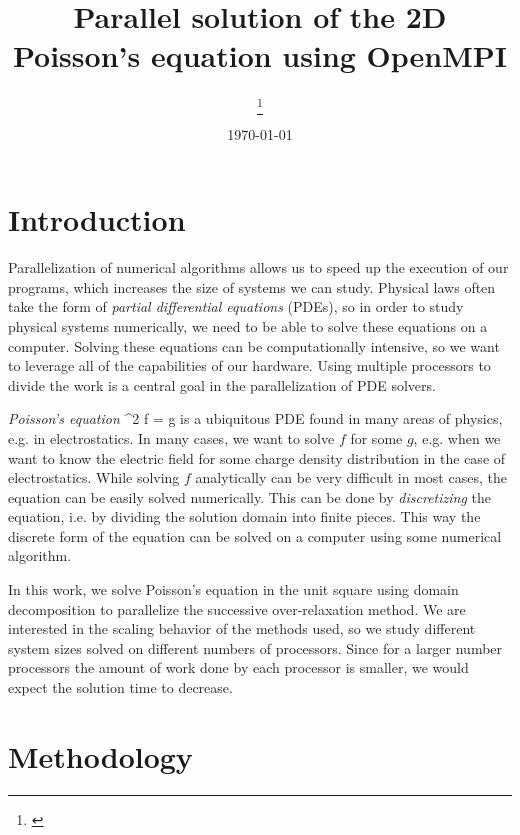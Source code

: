 \documentclass[10pt]{article}
\title {
  Parallel solution of the 2D Poisson's equation using OpenMPI
}
\date{\today}
\author[1] {
  \firstauth
  \orcid{0000-0001-9814-7358}
  \thanks{\href{mailto: \email}{\email}}
}
\begin{document}
\setlength{\belowcaptionskip}{0pt}


\normalsize

\maketitle


\section{Introduction}

Parallelization of numerical algorithms allows us to speed up the execution of our programs, which increases the size of systems we can study. Physical laws often take the form of \textit{partial differential equations} (PDEs), so in order to study physical systems numerically, we need to be able to solve these equations on a computer. Solving these equations can be computationally intensive, so we want to leverage all of the capabilities of our hardware. Using multiple processors to divide the work is a central goal in the parallelization of PDE solvers.

\textit{Poisson's equation}
\be
\nabla^2 f = g
\ee
is a ubiquitous PDE found in many areas of physics, e.g. in electrostatics. In many cases, we want to solve $f$ for some $g$, e.g. when we want to know the electric field for some charge density distribution in the case of electrostatics. While solving $f$ analytically can be very difficult in most cases, the equation can be easily solved numerically. This can be done by \textit{discretizing} the equation, i.e. by dividing the solution domain into finite pieces. This way the discrete form of the equation can be solved on a computer using some numerical algorithm.

In this work, we solve Poisson's equation in the unit square using domain decomposition to parallelize the successive over-relaxation method. We are interested in the scaling behavior of the methods used, so we study different system sizes solved on different numbers of processors. Since for a larger number processors the amount of work done by each processor is smaller, we would expect the solution time to decrease.

\section{Methodology} \label{back}
\end{document}

